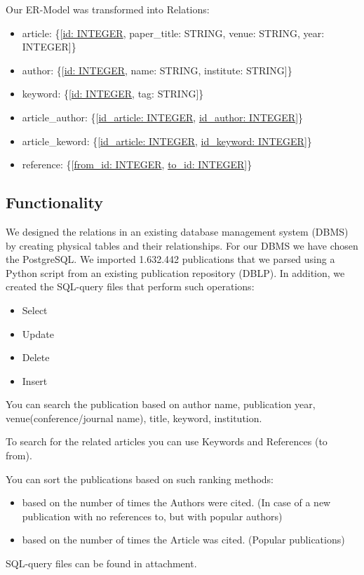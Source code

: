 \documentclass{article}
\begin{document}
\newpage
Our ER-Model was transformed into Relations:
\begin{itemize} 
	\item article: \{[\underline{id: INTEGER}, paper\_title: STRING, venue: STRING, year: INTEGER]\}
	\item author: \{[\underline{id: INTEGER}, name: STRING, institute: STRING]\}
	\item keyword: \{[\underline{id: INTEGER}, tag: STRING]\}
	\item article\_author: \{[\underline{id\_article: INTEGER}, \underline{id\_author: INTEGER}]\}
	\item article\_keword: \{[\underline{id\_article: INTEGER}, \underline{id\_keyword: INTEGER}]\}
	\item reference: \{[\underline{from\_id: INTEGER}, \underline{to\_id: INTEGER}]\}
\end{itemize} 

\subsection{Functionality}
We designed the relations in an existing database management system (DBMS) by creating physical tables and their relationships. For our DBMS we have chosen the PostgreSQL. We imported 1.632.442 publications that we parsed using a Python script from an existing publication repository (DBLP).
In addition, we created the SQL-query files that perform such operations:
\begin{itemize} 
	\item Select
	\item Update
	\item Delete
	\item Insert
\end{itemize}
You can search the publication based on author name, publication year, venue(conference/journal name), title, keyword, institution. 

To search for the related articles you can use Keywords and References (to\\from).

You can sort the publications based on such ranking methods:
\begin{itemize} 
	\item based on the number of times the Authors were cited. (In case of a new publication with no references to, but with popular authors)
	\item based on the number of times the Article was cited. (Popular publications)
\end{itemize}
SQL-query files can be found in attachment.
\end{document}
